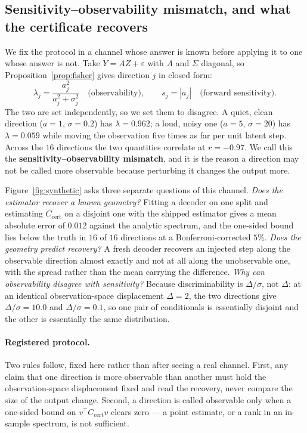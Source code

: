 \documentclass{article}
\theoremstyle{definition}
\newcommand{\Ccert}{C_{\mathrm{cert}}}
\begin{document}
\subsection{Sensitivity--observability mismatch, and what the certificate recovers}
\label{sec:synthetic}

We fix the protocol in a channel whose answer is known before applying it to one whose
answer is not. Take $Y=AZ+\varepsilon$ with $A$ and $\Sigma$ diagonal, so
Proposition~\ref{prop:fisher} gives direction $j$ in closed form:
\[
  \lambda_j=\frac{a_j^2}{a_j^2+\sigma_j^2}\quad\text{(observability)},
  \qquad
  s_j=|a_j|\quad\text{(forward sensitivity)} .
\]
The two are set independently, so we set them to disagree. A quiet, clean direction
($a=1$, $\sigma=0.2$) has $\lambda=0.962$; a loud, noisy one ($a=5$, $\sigma=20$) has
$\lambda=0.059$ while moving the observation five times as far per unit latent step.
Across the $16$ directions the two quantities correlate at $r=-0.97$. We call this the
\textbf{sensitivity--observability mismatch}, and it is the reason a direction may not be
called more observable because perturbing it changes the output more.

Figure~\ref{fig:synthetic} asks three separate questions of this channel.
\emph{Does the estimator recover a known geometry?} Fitting a decoder on one split and
estimating $\Ccert$ on a disjoint one with the shipped estimator gives a mean absolute
error of $0.012$ against the analytic spectrum, and the one-sided bound lies below the
truth in $16$ of $16$ directions at a Bonferroni-corrected $5\%$.
\emph{Does the geometry predict recovery?} A fresh decoder recovers an injected step
along the observable direction almost exactly and not at all along the unobservable one,
with the spread rather than the mean carrying the difference.
\emph{Why can observability disagree with sensitivity?} Because discriminability is
$\Delta/\sigma$, not $\Delta$: at an identical observation-space displacement
$\Delta=2$, the two directions give $\Delta/\sigma=10.0$ and $\Delta/\sigma=0.1$, so one
pair of conditionals is essentially disjoint and the other is essentially the same
distribution.

\paragraph{Registered protocol.}
Two rules follow, fixed here rather than after seeing a real channel. First, any claim
that one direction is more observable than another must hold the observation-space
displacement fixed and read the recovery, never compare the size of the output change.
Second, a direction is called observable only when a one-sided bound on
$v^\top\Ccert v$ clears zero --- a point estimate, or a rank in an in-sample spectrum, is
not sufficient.
\end{document}
